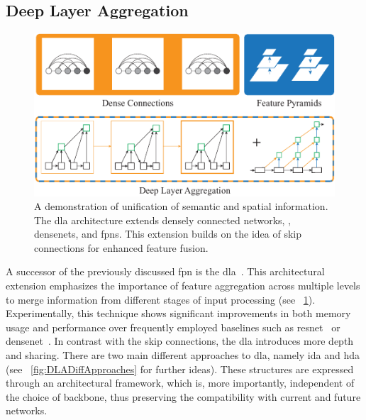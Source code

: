 \subsection{Deep Layer Aggregation}
\label{ssec:DeepLayerAggregation}

\begin{figure}[t]
    \centerline{\includegraphics[width=0.75\linewidth]{figures/theoretical_foundations/dla_comparison.pdf}}
    \caption[\Gls{dla} comparison]{A demonstration of unification of semantic and spatial information. The \gls{dla} architecture extends densely connected networks, \ietext{}, \glspl{densenet}, and \glspl{fpn}. This extension builds on the idea of skip connections for enhanced feature fusion. }
    \label{fig:DLAMotivation}
\end{figure}

A successor of the previously discussed \gls{fpn} is the \gls{dla}~\cite{yu2019dla}. This architectural extension emphasizes the importance of feature aggregation across multiple levels to merge information from different stages of input processing (see \figtext{}~\ref{fig:DLAMotivation}). Experimentally, this technique shows significant improvements in both memory usage and performance over frequently employed baselines such as \gls{resnet}~\cite{he2015resnet} or \gls{densenet}~\cite{huang2018densenet}. In contrast with the skip connections, the \gls{dla} introduces more depth and sharing. There are two main different approaches to \gls{dla}, namely \gls{ida} and \gls{hda} (see \figtext{}~\ref{fig:DLADiffApproaches} for further ideas). These structures are expressed through an architectural framework, which is, more importantly, independent of the choice of backbone, thus preserving the compatibility with current and future networks.

